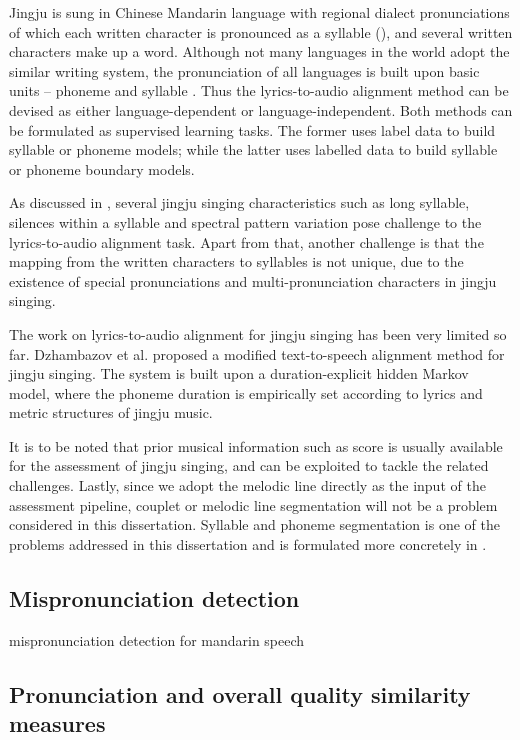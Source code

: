 Jingju is sung in Chinese Mandarin language with regional dialect pronunciations of which each written character is pronounced as a syllable (), and several written characters make up a word. Although not many languages in the world adopt the similar writing system, the pronunciation of all languages is built upon basic units -- phoneme and syllable \cite{Moran2014}. Thus the lyrics-to-audio alignment method can be devised as either language-dependent or language-independent. Both methods can be formulated as supervised learning tasks. The former uses label data to build syllable or phoneme models; while the latter uses labelled data to build syllable or phoneme boundary models.

As discussed in , several jingju singing characteristics such as long syllable, silences within a syllable and spectral pattern variation pose challenge to the lyrics-to-audio alignment task. Apart from that, another challenge is that the mapping from the written characters to syllables is not unique, due to the existence of special pronunciations and multi-pronunciation characters in jingju singing.

The work on lyrics-to-audio alignment for jingju singing has been very limited so far. Dzhambazov et al. \cite{dzhambazov_modeling_2015} proposed a modified text-to-speech alignment method for jingju singing. The system is built upon a duration-explicit hidden Markov model, where the phoneme duration is empirically set according to lyrics and metric structures of jingju music.

It is to be noted that prior musical information such as score is usually available for the assessment of jingju singing, and can be exploited to tackle the related challenges. Lastly, since we adopt the melodic line directly as the input of the assessment pipeline, couplet or melodic line segmentation will not be a problem considered in this dissertation. Syllable and phoneme segmentation is one of the problems addressed in this dissertation and is formulated more concretely in .

\subsection{Mispronunciation detection}

mispronunciation detection for mandarin speech

\subsection{Pronunciation and overall quality similarity measures}

